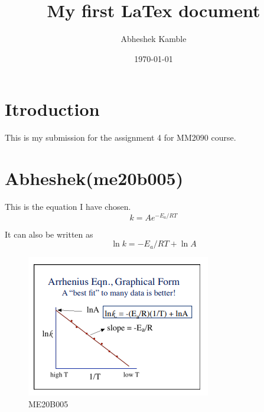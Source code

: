 \documentclass[a4paper, 12pt]{article}
\begin{document}
\title{My first LaTex document}
\author{Abheshek Kamble}
\date{\today}
\maketitle

\tableofcontents
\listoffigures

\section{Itroduction}

This is my submission for the assignment 4 for MM2090 course.


\section{Abheshek(me20b005)}
This is the equation I have chosen.
\begin{equation}
	k = Ae^{-E_a/RT}
	\label{eqn:arrhenius}
\end{equation}

It can also be written as
\begin{equation}
	\ln{k} = -E_a/RT + \ln{A}
	\label{eqn2:arrhenius}	
\end{equation}

\begin{figure}[h]
	\begin{center}
		\includegraphics[scale=0.75]{arrhenius.png}
	\end{center}
	\caption{ME20B005}
	\label{f1:graph}
\end{figure}
\end{document}
